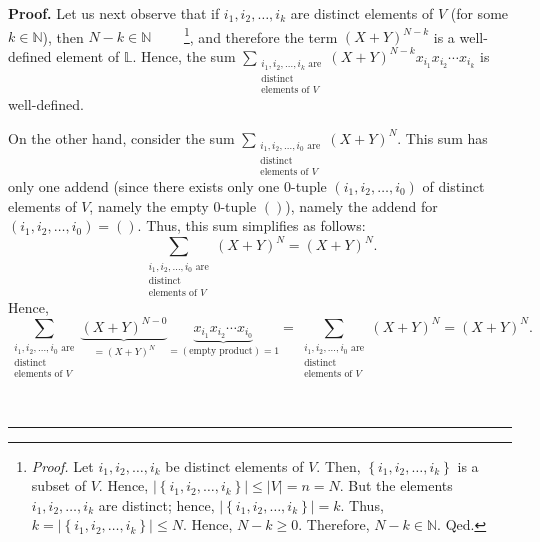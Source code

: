 \documentclass[numbers=enddot,12pt,final,onecolumn,notitlepage]{scrartcl}%
\theoremstyle{definition}
\newenvironment{proof}[1][Proof]{\noindent\textbf{#1.} }{\ \rule{0.5em}{0.5em}}
\let\sumnonlimits\sum
\renewcommand{\sum}{\sumnonlimits\limits}
\newenvironment{verlong}{}{}
\begin{document}
\begin{verlong}
\begin{proof}
Let us next observe that if $i_{1},i_{2},\ldots,i_{k}$ are distinct elements
of $V$ (for some $k\in\mathbb{N}$), then $N-k\in\mathbb{N}$%
\ \ \ \ \footnote{\textit{Proof.} Let $i_{1},i_{2},\ldots,i_{k}$ be distinct
elements of $V$. Then, $\left\{  i_{1},i_{2},\ldots,i_{k}\right\}  $ is a
subset of $V$. Hence, $\left\vert \left\{  i_{1},i_{2},\ldots,i_{k}\right\}
\right\vert \leq\left\vert V\right\vert =n=N$. But the elements $i_{1}%
,i_{2},\ldots,i_{k}$ are distinct; hence, $\left\vert \left\{  i_{1}%
,i_{2},\ldots,i_{k}\right\}  \right\vert =k$. Thus, $k=\left\vert \left\{
i_{1},i_{2},\ldots,i_{k}\right\}  \right\vert \leq N$. Hence, $N-k\geq0$.
Therefore, $N-k\in\mathbb{N}$. Qed.}, and therefore the term $\left(
X+Y\right)  ^{N-k}$ is a well-defined element of $\mathbb{L}$. Hence, the sum
$\sum_{\substack{i_{1},i_{2},\ldots,i_{k}\text{ are}\\\text{distinct}%
\\\text{elements of }V}}\left(  X+Y\right)  ^{N-k}x_{i_{1}}x_{i_{2}}\cdots
x_{i_{k}}$ is well-defined.

On the other hand, consider the sum $\sum_{\substack{i_{1},i_{2},\ldots
,i_{0}\text{ are}\\\text{distinct}\\\text{elements of }V}}\left(  X+Y\right)
^{N}$. This sum has only one addend (since there exists only one $0$-tuple
$\left(  i_{1},i_{2},\ldots,i_{0}\right)  $ of distinct elements of $V$,
namely the empty $0$-tuple $\left(  {}\right)  $), namely the addend for
$\left(  i_{1},i_{2},\ldots,i_{0}\right)  =\left(  {}\right)  $. Thus, this
sum simplifies as follows:%
\[
\sum_{\substack{i_{1},i_{2},\ldots,i_{0}\text{ are}\\\text{distinct}%
\\\text{elements of }V}}\left(  X+Y\right)  ^{N}=\left(  X+Y\right)  ^{N}.
\]
Hence,%
\[
\sum_{\substack{i_{1},i_{2},\ldots,i_{0}\text{ are}\\\text{distinct}%
\\\text{elements of }V}}\underbrace{\left(  X+Y\right)  ^{N-0}}_{=\left(
X+Y\right)  ^{N}}\underbrace{x_{i_{1}}x_{i_{2}}\cdots x_{i_{0}}}_{=\left(
\text{empty product}\right)  =1}=\sum_{\substack{i_{1},i_{2},\ldots
,i_{0}\text{ are}\\\text{distinct}\\\text{elements of }V}}\left(  X+Y\right)
^{N}=\left(  X+Y\right)  ^{N}.
\]



\end{proof}
\end{verlong}
\end{document}

